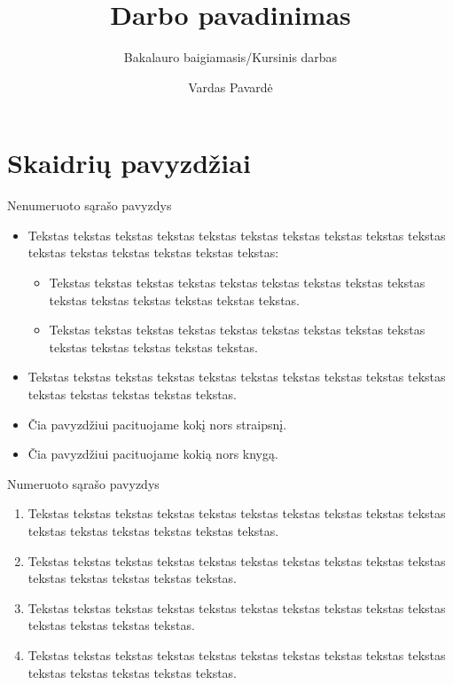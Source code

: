 \documentclass[12pt]{beamer}
\title[]{Darbo pavadinimas}
\subtitle[]{Bakalauro baigiamasis/Kursinis darbas}
\author[Vardas Pavardė]{Vardas Pavardė}
\date{}
\begin{document}
\begin{frame}
    \titlepage
\end{frame}

\section{Skaidrių pavyzdžiai}


\begin{frame}{Nenumeruoto sąrašo pavyzdys}
    \begin{itemize}
    \item Tekstas tekstas tekstas tekstas tekstas tekstas tekstas tekstas tekstas tekstas tekstas tekstas tekstas tekstas tekstas tekstas:
        \begin{itemize}
        \item Tekstas tekstas tekstas tekstas tekstas tekstas tekstas tekstas tekstas tekstas tekstas tekstas tekstas tekstas tekstas.
        \item Tekstas tekstas tekstas tekstas tekstas tekstas tekstas tekstas tekstas tekstas tekstas tekstas tekstas tekstas.
        \end{itemize}
    \item Tekstas tekstas tekstas tekstas tekstas tekstas tekstas tekstas tekstas tekstas tekstas tekstas tekstas tekstas tekstas.
    \item Čia pavyzdžiui pacituojame kokį nors straipsnį\cite{Januschowski_2020}.
    \item Čia pavyzdžiui pacituojame kokią nors knygą\cite{Abraham_2009}.
    \end{itemize}
\end{frame}


\begin{frame}{Numeruoto sąrašo pavyzdys}
    \begin{enumerate}
    \item Tekstas tekstas tekstas tekstas tekstas tekstas tekstas tekstas tekstas tekstas tekstas tekstas tekstas tekstas tekstas tekstas.
    \item Tekstas tekstas tekstas tekstas tekstas tekstas tekstas tekstas tekstas tekstas tekstas tekstas tekstas tekstas tekstas.
    \item Tekstas tekstas tekstas tekstas tekstas tekstas tekstas tekstas tekstas tekstas tekstas tekstas tekstas tekstas.
    \item Tekstas tekstas tekstas tekstas tekstas tekstas tekstas tekstas tekstas tekstas tekstas tekstas tekstas tekstas tekstas.
    \end{enumerate}
\end{frame}
\end{document}
